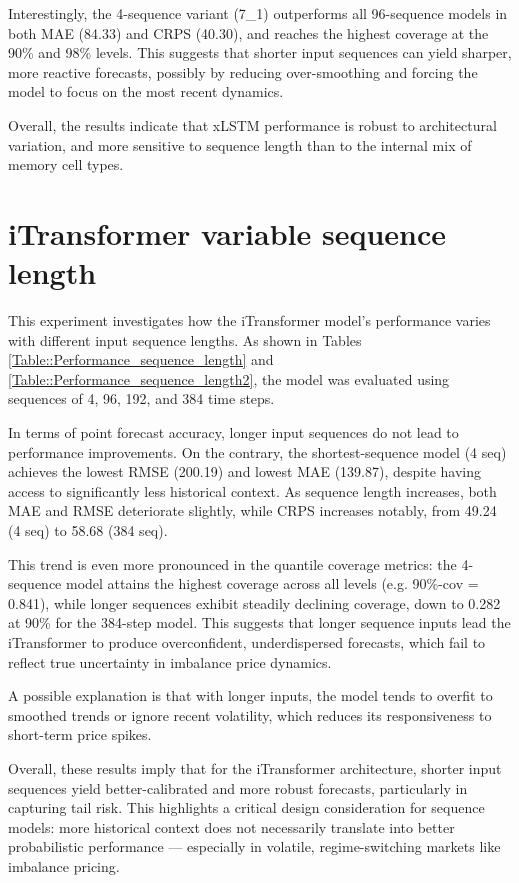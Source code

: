 \documentclass[class=scrbook, crop=false]{standalone}
\begin{document}
Interestingly, the 4-sequence variant (7\_1) outperforms all 96-sequence models in both MAE (84.33) and CRPS (40.30), and reaches the highest coverage at the 90\% and 98\% levels. This suggests that shorter input sequences can yield sharper, more reactive forecasts, possibly by reducing over-smoothing and forcing the model to focus on the most recent dynamics. 

Overall, the results indicate that xLSTM performance is robust to architectural variation, and more sensitive to sequence length than to the internal mix of memory cell types.


\section{iTransformer variable sequence length}
This experiment investigates how the iTransformer model’s performance varies with different input sequence lengths. As shown in Tables \ref{Table::Performance_sequence_length} and \ref{Table::Performance_sequence_length2}, the model was evaluated using sequences of 4, 96, 192, and 384 time steps.

In terms of point forecast accuracy, longer input sequences do not lead to performance improvements. On the contrary, the shortest-sequence model (4 seq) achieves the lowest RMSE (200.19) and lowest MAE (139.87), despite having access to significantly less historical context. As sequence length increases, both MAE and RMSE deteriorate slightly, while CRPS increases notably, from 49.24 (4 seq) to 58.68 (384 seq).

This trend is even more pronounced in the quantile coverage metrics: the 4-sequence model attains the highest coverage across all levels (e.g. 90\%-cov = 0.841), while longer sequences exhibit steadily declining coverage, down to 0.282 at 90\% for the 384-step model. This suggests that longer sequence inputs lead the iTransformer to produce overconfident, underdispersed forecasts, which fail to reflect true uncertainty in imbalance price dynamics.

A possible explanation is that with longer inputs, the model tends to overfit to smoothed trends or ignore recent volatility, which reduces its responsiveness to short-term price spikes. 

Overall, these results imply that for the iTransformer architecture, shorter input sequences yield better-calibrated and more robust forecasts, particularly in capturing tail risk. This highlights a critical design consideration for sequence models: more historical context does not necessarily translate into better probabilistic performance — especially in volatile, regime-switching markets like imbalance pricing.
\end{document}
